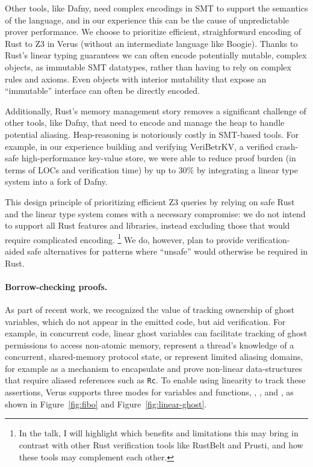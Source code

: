 \documentclass[11pt,twocolumn]{article}
\newcommand{\codesize}{\fontsize{8pt}{9pt}\selectfont}
\newcommand{\textcode}[1]{{\codesize\ttfamily{#1}}}
\renewcommand{\section}[1]{\paragraph{#1.}}
\begin{document}
Other tools, like Dafny, need complex encodings in SMT to support the
semantics of the language, and in our
experience this can be the cause of unpredictable prover performance.
We choose to prioritize efficient, straighforward encoding of Rust to Z3 in
Verus (without an intermediate language like Boogie).
Thanks to Rust's linear typing guarantees we can
often encode potentially mutable, complex objects, as immutable SMT
datatypes, rather than having to rely on complex rules and axioms. Even
objects with interior mutability that expose an ``immutable''
interface can often be directly encoded.

Additionally, Rust's memory management story removes a significant
challenge of other tools, like Dafny, that need to encode and manage the
heap to handle potential aliasing. Heap-reasoning is notoriously costly in SMT-based tools.
For example, in our experience building and verifying VeriBetrKV, a verified crash-safe
high-performance key-value store, we were able to reduce proof burden
(in terms of LOCs and verification time) by up to 30\% by integrating a
linear type system into a fork of Dafny.

This design principle of prioritizing efficient Z3 queries
by relying on safe Rust and the linear type system
comes with a necessary compromise:
we do not intend to support all Rust features and libraries,
instead excluding those that would
require complicated encoding.
\footnote{In the talk, I will highlight which benefits and
limitations this may bring in contrast with other Rust verification
tools like RustBelt and Prusti, and how these tools may complement each other.}
We do, however, plan to provide
verification-aided safe alternatives for patterns where ``unsafe''
would otherwise be required in Rust.

\section{Borrow-checking proofs}\label{borrow-checking-proofs}

As part of recent work, we recognized the value
of tracking ownership of ghost variables, which do not appear in the
emitted code, but aid verification. For example, in concurrent code,
linear ghost variables can facilitate tracking of ghost permissions to
access non-atomic memory, represent a thread's knowledge of a
concurrent, shared-memory protocol state, or represent limited
aliasing domains, for example as a mechanism to encapsulate and prove
non-linear data-structures that require aliased references such as
\texttt{Rc}. To enable using linearity to track these assertions,
Verus supports three modes for variables and functions,
\textbf{\textcode{\#{[}spec{]}}}, \textbf{\textcode{\#{[}proof{]}}}, and
\textbf{\textcode{\#{[}exec{]}}}, as shown in Figure~\ref{fig:fibo} and
Figure~\ref{fig:linear-ghost}.
\end{document}

